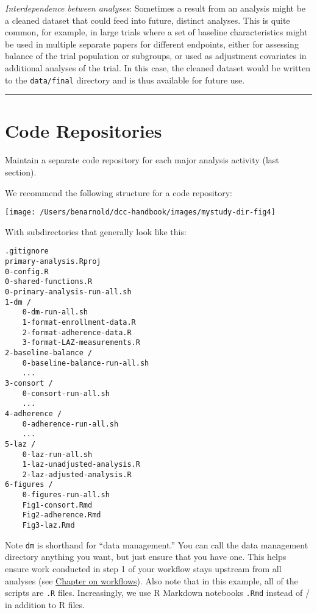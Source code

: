 \documentclass[
]{book}
\begin{document}
\emph{Interdependence between analyses}: Sometimes a result from an analysis might be a cleaned dataset that could feed into future, distinct analyses. This is quite common, for example, in large trials where a set of baseline characteristics might be used in multiple separate papers for different endpoints, either for assessing balance of the trial population or subgroups, or used as adjustment covariates in additional analyses of the trial. In this case, the cleaned dataset would be written to the \texttt{data/final} directory and is thus available for future use.

\begin{center}\rule{0.5\linewidth}{\linethickness}\end{center}

\hypertarget{code-repositories}{%
\section{Code Repositories}\label{code-repositories}}

Maintain a separate code repository for each major analysis activity (last section).

We recommend the following structure for a code repository:

\texttt{[image: /Users/benarnold/dcc-handbook/images/mystudy-dir-fig4]}

With subdirectories that generally look like this:

\begin{verbatim}
.gitignore
primary-analysis.Rproj
0-config.R
0-shared-functions.R
0-primary-analysis-run-all.sh
1-dm /
    0-dm-run-all.sh
    1-format-enrollment-data.R
    2-format-adherence-data.R
    3-format-LAZ-measurements.R
2-baseline-balance /
    0-baseline-balance-run-all.sh
    ...
3-consort /
    0-consort-run-all.sh
    ...
4-adherence /
    0-adherence-run-all.sh
    ...
5-laz /
    0-laz-run-all.sh
    1-laz-unadjusted-analysis.R
    2-laz-adjusted-analysis.R
6-figures / 
    0-figures-run-all.sh
    Fig1-consort.Rmd
    Fig2-adherence.Rmd
    Fig3-laz.Rmd
\end{verbatim}

Note \texttt{dm} is shorthand for ``data management.'' You can call the data management directory anything you want, but just ensure that you have one. This helps ensure work conducted in step 1 of your workflow stays upstream from all analyses (see \protect\hyperlink{workflows}{Chapter on workflows}). Also note that in this example, all of the scripts are \texttt{.R} files. Increasingly, we use R Markdown notebooks \texttt{.Rmd} instead of / in addition to R files.
\end{document}
